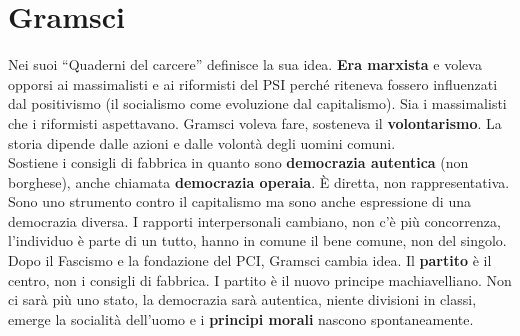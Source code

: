 
\section{Gramsci}
Nei suoi ``Quaderni del carcere'' definisce la sua idea. \textbf{Era marxista} e voleva opporsi ai
massimalisti e ai riformisti del PSI perché riteneva fossero influenzati dal positivismo (il 
socialismo come evoluzione dal capitalismo). Sia i massimalisti che i riformisti aspettavano. Gramsci
voleva fare, sosteneva il \textbf{volontarismo}. La storia dipende dalle azioni e dalle volontà
degli uomini comuni.\\
Sostiene i consigli di fabbrica in quanto sono \textbf{democrazia autentica} (non borghese), anche
chiamata \textbf{democrazia operaia}. È diretta, non rappresentativa. Sono uno strumento contro il
capitalismo ma sono anche espressione di una democrazia diversa. I rapporti interpersonali cambiano,
non c'è più concorrenza, l'individuo è parte di un tutto, hanno in comune il bene comune, non del 
singolo.\\ [\baselineskip]
Dopo il Fascismo e la fondazione del PCI, Gramsci cambia idea. Il \textbf{partito} è il centro, non
i consigli di fabbrica. I partito è il nuovo principe machiavelliano. Non ci sarà più uno stato, la
democrazia sarà autentica, niente divisioni in classi, emerge la socialità dell'uomo e i 
\textbf{principi morali} nascono spontaneamente.
